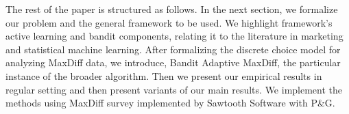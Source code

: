 \documentclass[a4paper,12pt]{article}
\newcommand{\eric}[1]{\textcolor{red}{\textbf{(eric)} #1}}
\begin{document}
The rest of the paper is structured as follows. In the next section, we formalize our problem and the general framework to be used. We highlight framework's active learning and bandit components, relating it to the literature in marketing and statistical machine learning. After formalizing the discrete choice model for analyzing MaxDiff data, we introduce, Bandit Adaptive MaxDiff, the particular instance of the broader algorithm. Then we present our empirical results in regular setting and then present variants of our main results. We implement the methods using MaxDiff survey implemented by Sawtooth Software with P\&G. 


















\end{document}
